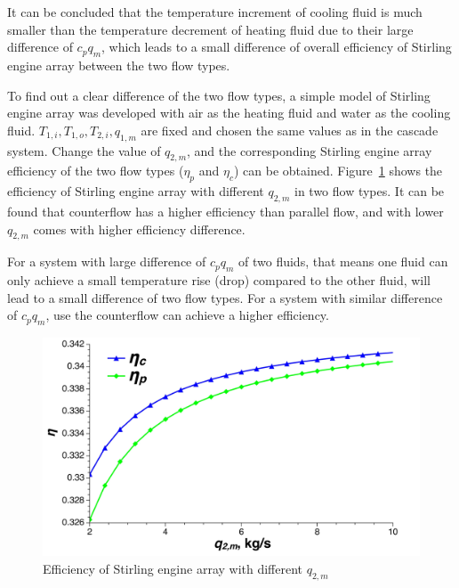 It can be concluded that the temperature increment of cooling fluid is much smaller than the temperature decrement of heating fluid due to their large difference of $c_pq_m$, which leads to a small difference of overall efficiency of Stirling engine array between the two flow types.

To find out a clear difference of the two flow types, a simple model of Stirling engine array was developed with air as the heating fluid and water as the cooling fluid. $T_{1,i}, T_{1,o}, T_{2,i}, q_{1,m}$ are fixed and chosen the same values as in the cascade system. Change the value of $q_{2,m}$, and the corresponding Stirling engine array efficiency of the two flow types ($\eta_p$ and $\eta_c$) can be obtained. Figure~\ref{fig:SEAflowtypes} shows the efficiency of Stirling engine array with different $q_{2,m}$ in two flow types. It can be found that counterflow has a higher efficiency than parallel flow, and with lower $q_{2,m}$ comes with higher efficiency difference.

For a system with large difference of $c_pq_m$ of two fluids, that means one fluid can only achieve a small temperature rise (drop) compared to the other fluid, will lead to a small difference of two flow types. For a system with similar difference of $c_pq_m$, use the counterflow can achieve a higher efficiency.

\noindent \begin{figure}[H]
\begin{center}
	\includegraphics[width = 0.8\columnwidth, angle = 0]{fig/SEAflowtypes}
	\caption{Efficiency of Stirling engine array with different $q_{2,m}$}
	\label{fig:SEAflowtypes}
\end{center}
\end{figure}

